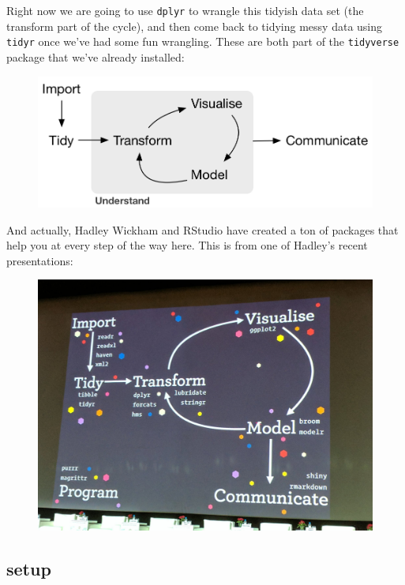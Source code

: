 \documentclass[]{book}
\theoremstyle{definition}
\theoremstyle{definition}
\theoremstyle{definition}
\theoremstyle{remark}
\begin{document}
Right now we are going to use \texttt{dplyr} to wrangle this tidyish
data set (the transform part of the cycle), and then come back to
tidying messy data using \texttt{tidyr} once we've had some fun
wrangling. These are both part of the \texttt{tidyverse} package that
we've already installed:

\begin{figure}[htbp]
\centering
\includegraphics{img/r4ds_data-science.png}
\caption{}
\end{figure}

And actually, Hadley Wickham and RStudio have created a ton of packages
that help you at every step of the way here. This is from one of
Hadley's recent presentations:

\begin{figure}[htbp]
\centering
\includegraphics{img/tidyverse_wickham_pres.jpg}
\caption{}
\end{figure}

\subsection{setup}\label{setup}
\end{document}
